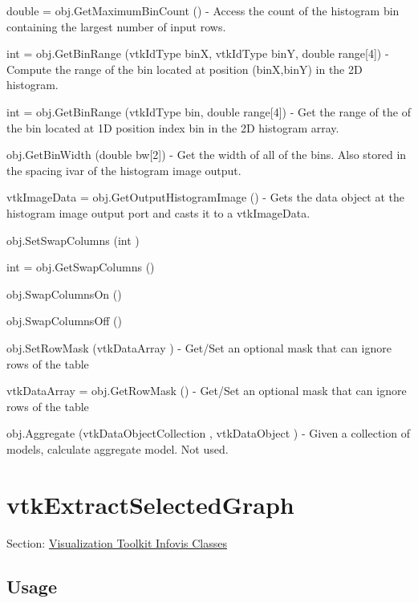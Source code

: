 \begin{DoxyItemize}
\item {\ttfamily double = obj.\-Get\-Maximum\-Bin\-Count ()} -\/ Access the count of the histogram bin containing the largest number of input rows.  
\item {\ttfamily int = obj.\-Get\-Bin\-Range (vtk\-Id\-Type bin\-X, vtk\-Id\-Type bin\-Y, double range\mbox{[}4\mbox{]})} -\/ Compute the range of the bin located at position (bin\-X,bin\-Y) in the 2\-D histogram.  
\item {\ttfamily int = obj.\-Get\-Bin\-Range (vtk\-Id\-Type bin, double range\mbox{[}4\mbox{]})} -\/ Get the range of the of the bin located at 1\-D position index bin in the 2\-D histogram array.  
\item {\ttfamily obj.\-Get\-Bin\-Width (double bw\mbox{[}2\mbox{]})} -\/ Get the width of all of the bins. Also stored in the spacing ivar of the histogram image output.  
\item {\ttfamily vtk\-Image\-Data = obj.\-Get\-Output\-Histogram\-Image ()} -\/ Gets the data object at the histogram image output port and casts it to a vtk\-Image\-Data.  
\item {\ttfamily obj.\-Set\-Swap\-Columns (int )}  
\item {\ttfamily int = obj.\-Get\-Swap\-Columns ()}  
\item {\ttfamily obj.\-Swap\-Columns\-On ()}  
\item {\ttfamily obj.\-Swap\-Columns\-Off ()}  
\item {\ttfamily obj.\-Set\-Row\-Mask (vtk\-Data\-Array )} -\/ Get/\-Set an optional mask that can ignore rows of the table  
\item {\ttfamily vtk\-Data\-Array = obj.\-Get\-Row\-Mask ()} -\/ Get/\-Set an optional mask that can ignore rows of the table  
\item {\ttfamily obj.\-Aggregate (vtk\-Data\-Object\-Collection , vtk\-Data\-Object )} -\/ Given a collection of models, calculate aggregate model. Not used.  
\end{DoxyItemize}\hypertarget{vtkinfovis_vtkextractselectedgraph}{}\section{vtk\-Extract\-Selected\-Graph}\label{vtkinfovis_vtkextractselectedgraph}
Section\-: \hyperlink{sec_vtkinfovis}{Visualization Toolkit Infovis Classes} \hypertarget{vtkwidgets_vtkxyplotwidget_Usage}{}\subsection{Usage}\label{vtkwidgets_vtkxyplotwidget_Usage}

